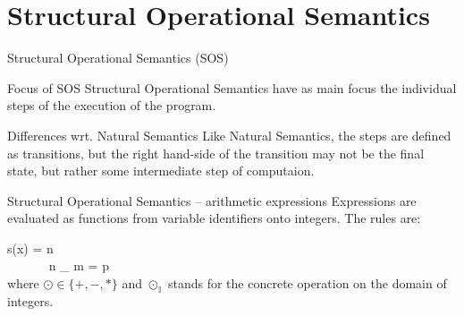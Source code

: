 \documentclass[aspectratio=169]{beamer}
\begin{document}
\section*{Structural Operational Semantics}

\begin{slide}{Structural Operational Semantics (SOS)}
\begin{block}{Focus of SOS}
Structural Operational Semantics have as main focus the individual steps of the execution of the program.
\end{block}

\begin{block}{Differences wrt. Natural Semantics}
Like Natural Semantics, the steps are defined as transitions, but the right hand-side of the transition may not be the final state, but rather some intermediate step of computaion.
\end{block}
\end{slide}

\begin{slide}{Structural Operational Semantics -- arithmetic expressions}
\small 
Expressions are evaluated as functions from variable identifiers onto integers. The rules are:
\centering
\newcommand{\msep}{~~~~~~}

%
  {s(x) = n}%
  { \Longrightarrow {}}
\msep %
%
  {\Longrightarrow {}}%
  { \Longrightarrow {}}
\\[5mm]
%
  { \Longrightarrow {}}%
  { \Longrightarrow {}}
\msep %
%
  {n \odot_{} m = p \in {}}%
  { \Longrightarrow {}}
\\[5mm]
\flushleft 
where $\odot \in \{+,-,*\}$ and $\odot_\mathbb{I}$ stands for the concrete operation on the domain of integers. 
\end{slide}
\end{document}
